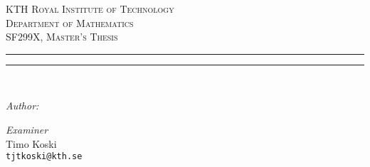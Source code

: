\begin{titlepage}
\begin{center}

\makeatletter


\textsc{{\LARGE KTH Royal Institute of Technology}
\\[0.3cm]
{\large Department of Mathematics}
\\[0.7cm]
{\Large SF299X, Master's Thesis}}\\[0.5cm]

\noindent
\rule{\linewidth}{0.2mm}
{ \begin{spacing}{1.5} \Huge \bfseries \@title \end{spacing} }
\noindent
\rule{\linewidth}{0.2mm}\\[1.5cm]

\begin{minipage}{0.4\textwidth}
\begin{flushleft} \large
\emph{Author:}\\
\@author
\end{flushleft}
\end{minipage}
\begin{minipage}{0.4\textwidth}
\begin{flushright} \large
\emph{Examiner} \\
Timo Koski\\
\texttt{tjtkoski@kth.se}
\end{flushright}
\end{minipage}

\vfill

{\large \@date}

\makeatother

\end{center}
\end{titlepage}
